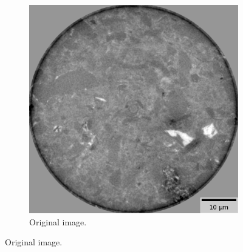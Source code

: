 \begin{figure}
  \begin{subfigure}[t]{\textwidth}
    \centering
    \includegraphics[width=.45\textwidth]{figures/shalens.png}
    \caption{Original image. }
  \end{subfigure}

  \medskip


\end{figure}
